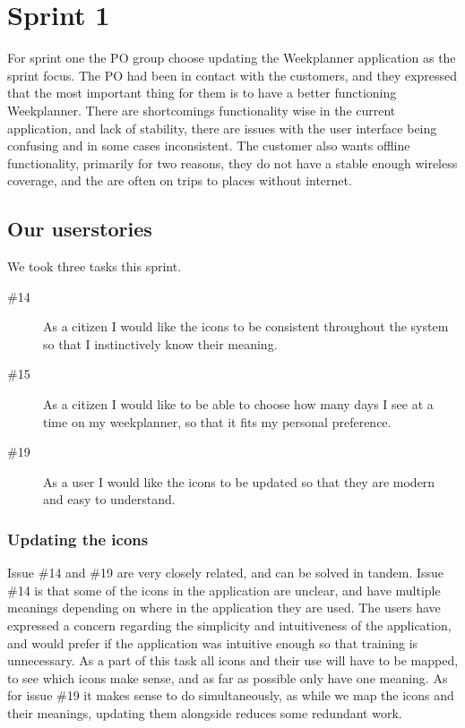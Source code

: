\chapter{Sprint 1}

For sprint one the \gls{PO} group choose updating the Weekplanner application as the sprint focus. 
The \gls{PO} had been in contact with the customers, and they expressed that the most important thing for them is to have a better functioning Weekplanner.
There are shortcomings functionality wise  in the current application, and lack of stability, there are issues with the user interface being confusing and in some cases inconsistent. The customer also wants offline functionality, primarily for two reasons, they do not have a stable enough wireless coverage, and the are often on trips to places without internet.

\section{Our userstories}
We took three tasks this sprint.
\begin{description}
    \item [\#14] As a citizen I would like the icons to be consistent throughout the system so that I instinctively know their meaning.
    \item [\#15] As a citizen I would like to be able to choose how many days I see at a time on my weekplanner, so that it fits my personal preference.
    \item [\#19] As a user I would like the icons to be updated so that they are modern and easy to understand.
\end{description}

\subsection{Updating the icons}
Issue \#14 and \#19 are very closely related, and can be solved in tandem. Issue \#14 is that some of the icons in the application are unclear, and have multiple meanings depending on where in the application they are used. The users have expressed a concern regarding the simplicity and intuitiveness of the application, and would prefer if the application was intuitive enough so that training is unnecessary.
As a part of this task all icons and their use will have to be mapped, to see which icons make sense, and as far as possible only have one meaning. As for issue \#19 it makes sense to do simultaneously, as while we map the icons and their meanings, updating them alongside reduces some redundant work. 


